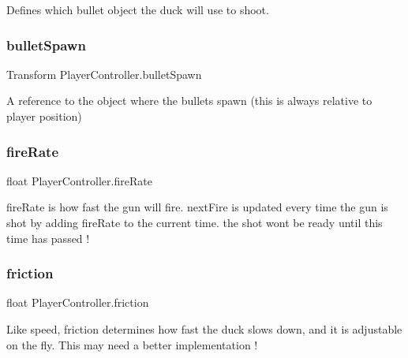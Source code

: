 Defines which bullet object the duck will use to shoot. 

\mbox{\label{class_player_controller_a45263a41dbdfe88658e0b58196aeba98}} 
\subsubsection{\texorpdfstring{bulletSpawn}{bulletSpawn}}
{\footnotesize\ttfamily Transform Player\+Controller.\+bullet\+Spawn}



A reference to the object where the bullets spawn (this is always relative to player position) 

\mbox{\label{class_player_controller_aec1e8f25c69ea198fe38f965307437a4}} 
\subsubsection{\texorpdfstring{fireRate}{fireRate}}
{\footnotesize\ttfamily float Player\+Controller.\+fire\+Rate}

fire\+Rate is how fast the gun will fire. next\+Fire is updated every time the gun is shot by adding fire\+Rate to the current time. the shot won\textquotesingle{}t be ready until this time has passed ! \mbox{\label{class_player_controller_a22510e0221512fb7fe06808912fa1a55}} 
\subsubsection{\texorpdfstring{friction}{friction}}
{\footnotesize\ttfamily float Player\+Controller.\+friction}

Like speed, friction determines how fast the duck slows down, and it is adjustable on the fly. This may need a better implementation ! \mbox{\label{class_player_controller_a6206943367033fb9307accaf27f9a1ef}} 
